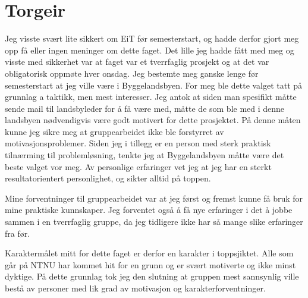 \section{Torgeir}
Jeg visste svært lite sikkert om EiT før semesterstart, og hadde derfor gjort meg opp få eller ingen meninger om dette faget. Det lille jeg hadde fått med meg og visste med sikkerhet var at faget var et tverrfaglig prosjekt og at det var obligatorisk oppmøte hver onsdag. Jeg bestemte meg ganske lenge før semesterstart at jeg ville være i Byggelandsbyen. For meg ble dette valget tatt på grunnlag a taktikk, men mest interesser. Jeg antok at siden man spesifikt måtte sende mail til landsbyleder for å få være med, måtte de som ble med i denne landsbyen nødvendigvis være godt motivert for dette prosjektet. På denne måten kunne jeg sikre meg at gruppearbeidet ikke ble forstyrret av motivasjonsproblemer. Siden jeg i tillegg er en person med sterk praktisk tilnærming til problemløsning, tenkte jeg at Byggelandsbyen måtte være det beste valget vor meg. Av personlige erfaringer vet jeg at jeg har en sterkt resultatorientert personlighet, og sikter alltid på toppen. 

Mine forventninger til gruppearbeidet var at jeg først og fremst kunne få bruk for mine praktiske kunnskaper. Jeg forventet også å få nye erfaringer i det å jobbe sammen i en tverrfaglig gruppe, da jeg tidligere ikke har så mange slike erfaringer fra før.   

Karaktermålet mitt for dette faget er derfor en karakter i toppsjiktet. Alle som går på NTNU har kommet hit for en grunn og er svært motiverte og ikke minst dyktige. På dette grunnlag tok jeg den slutning at gruppen mest sannsynlig ville bestå av personer med lik grad av motivasjon og karakterforventninger.     
